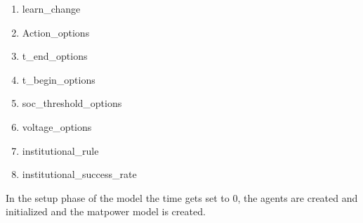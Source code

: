 \documentclass[a4paper]{article}
\begin{document}
\begin{enumerate}
\begin{enumerate}
                          \item learn\_change
                          \item Action\_options
                          \item t\_end\_options
                          \item t\_begin\_options
                          \item soc\_threshold\_options
                          \item voltage\_options
                          \item institutional\_rule
                          \item institutional\_success\_rate
                         \end{enumerate}
\end{enumerate}

\newpage
In the setup phase of the model the time gets set to 0, the agents are created and initialized and the 
matpower model is created. 
\end{document}
